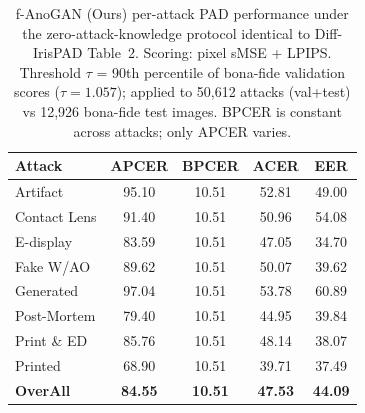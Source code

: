 \begin{table}[t]
\centering
\small
\caption{f-AnoGAN (Ours) per-attack PAD performance under the zero-attack-knowledge protocol identical to Diff-IrisPAD Table~2. Scoring: pixel sMSE + LPIPS. Threshold $\tau$ = 90th percentile of bona-fide validation scores ($\tau{=}1.057$); applied to 50{,}612 attacks (val+test) vs 12{,}926 bona-fide test images. BPCER is constant across attacks; only APCER varies.}
\label{tab:fanogan_reconscore}
\begin{tabular}{l|cccc}
\toprule
Attack & APCER & BPCER & ACER & EER \\
\midrule
Artifact & 95.10 & 10.51 & 52.81 & 49.00 \\
Contact Lens & 91.40 & 10.51 & 50.96 & 54.08 \\
E-display & 83.59 & 10.51 & 47.05 & 34.70 \\
Fake W/AO & 89.62 & 10.51 & 50.07 & 39.62 \\
Generated & 97.04 & 10.51 & 53.78 & 60.89 \\
Post-Mortem & 79.40 & 10.51 & 44.95 & 39.84 \\
Print \& ED & 85.76 & 10.51 & 48.14 & 38.07 \\
Printed & 68.90 & 10.51 & 39.71 & 37.49 \\
\midrule
\textbf{OverAll} & \textbf{84.55} & \textbf{10.51} & \textbf{47.53} & \textbf{44.09} \\
\bottomrule
\end{tabular}
\end{table}
